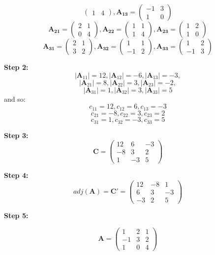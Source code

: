 \documentclass[11pt]{article}
\theoremstyle{definition}
\theoremstyle{remark}
\begin{document}
\begin{itemize}
$$\begin{pmatrix}
1&4
\end{pmatrix}
,  
\mathbf{A_{13}}=
\begin{pmatrix}
-1&3 \\
1&0 
\end{pmatrix}
$$
$$
\mathbf{A_{21}}=
\begin{pmatrix}
2&1 \\
0&4 
\end{pmatrix}
,  
\mathbf{A_{22}}=
\begin{pmatrix}
1&1 \\
1&4
\end{pmatrix}
,  
\mathbf{A_{23}}=
\begin{pmatrix}
1&2 \\
1&0 
\end{pmatrix}
$$
$$
\mathbf{A_{31}}=
\begin{pmatrix}
2&1 \\
3&2 
\end{pmatrix}
,  
\mathbf{A_{32}}=
\begin{pmatrix}
1&1 \\
-1&2
\end{pmatrix}
,  
\mathbf{A_{33}}=
\begin{pmatrix}
1&2 \\
-1&3 
\end{pmatrix}
$$

\textbf{Step 2:}
$$
|\mathbf{A}_{11}| = 12, |\mathbf{A}_{12}| = -6, |\mathbf{A}_{13}| = -3,  
$$
$$
|\mathbf{A}_{21}| = 8, |\mathbf{A}_{22}| = 3, |\mathbf{A}_{23}| = -2,  
$$
$$
|\mathbf{A}_{31}| = 1, |\mathbf{A}_{32}| = 3, |\mathbf{A}_{33}| = 5
$$
and so:
$$
c_{11} = 12,  c_{12} = 6,  c_{13} = -3 
$$
$$
c_{21} = -8,  c_{22} = 3,  c_{23} = 2
$$
$$
c_{31} = 1,  c_{32} = -3,  c_{33} = 5
$$

\textbf{Step 3:}
$$
\mathbf{C} = 
\begin{pmatrix}
12&6&-3 \\
-8&3&2 \\
1&-3&5
\end{pmatrix}
$$

\textbf{Step 4:}
$$
adj(\mathbf{A})=\mathbf{C'}=
\begin{pmatrix}
12&-8&1 \\
6&3&-3 \\
-3&2&5
\end{pmatrix}
$$

\textbf{Step 5:}

$$
\mathbf{A} = 
\begin{pmatrix}
1&2&1 \\
-1&3&2 \\
1&0&4
\end{pmatrix}
$$


\end{itemize}
\end{document}
